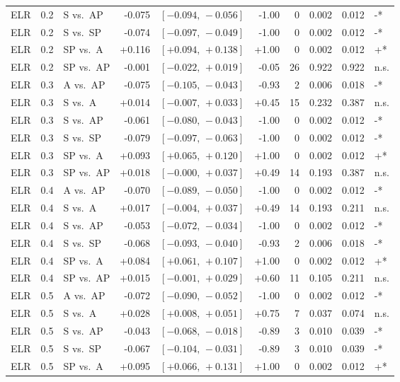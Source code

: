 \begin{landscape}
\begin{scriptsize}
\begin{longtable}{lllrrrrrrl}
ELR & 0.2 & S vs.\ AP & -0.075 & $[-0.094,\,-0.056]$ & -1.00 & 0 & 0.002 & 0.012 & -* \\
ELR & 0.2 & S vs.\ SP & -0.074 & $[-0.097,\,-0.049]$ & -1.00 & 0 & 0.002 & 0.012 & -* \\
ELR & 0.2 & SP vs.\ A & +0.116 & $[+0.094,\,+0.138]$ & +1.00 & 0 & 0.002 & 0.012 & +* \\
ELR & 0.2 & SP vs.\ AP & -0.001 & $[-0.022,\,+0.019]$ & -0.05 & 26 & 0.922 & 0.922 & n.s. \\
ELR & 0.3 & A vs.\ AP & -0.075 & $[-0.105,\,-0.043]$ & -0.93 & 2 & 0.006 & 0.018 & -* \\
ELR & 0.3 & S vs.\ A & +0.014 & $[-0.007,\,+0.033]$ & +0.45 & 15 & 0.232 & 0.387 & n.s. \\
ELR & 0.3 & S vs.\ AP & -0.061 & $[-0.080,\,-0.043]$ & -1.00 & 0 & 0.002 & 0.012 & -* \\
ELR & 0.3 & S vs.\ SP & -0.079 & $[-0.097,\,-0.063]$ & -1.00 & 0 & 0.002 & 0.012 & -* \\
ELR & 0.3 & SP vs.\ A & +0.093 & $[+0.065,\,+0.120]$ & +1.00 & 0 & 0.002 & 0.012 & +* \\
ELR & 0.3 & SP vs.\ AP & +0.018 & $[-0.000,\,+0.037]$ & +0.49 & 14 & 0.193 & 0.387 & n.s. \\
ELR & 0.4 & A vs.\ AP & -0.070 & $[-0.089,\,-0.050]$ & -1.00 & 0 & 0.002 & 0.012 & -* \\
ELR & 0.4 & S vs.\ A & +0.017 & $[-0.004,\,+0.037]$ & +0.49 & 14 & 0.193 & 0.211 & n.s. \\
ELR & 0.4 & S vs.\ AP & -0.053 & $[-0.072,\,-0.034]$ & -1.00 & 0 & 0.002 & 0.012 & -* \\
ELR & 0.4 & S vs.\ SP & -0.068 & $[-0.093,\,-0.040]$ & -0.93 & 2 & 0.006 & 0.018 & -* \\
ELR & 0.4 & SP vs.\ A & +0.084 & $[+0.061,\,+0.107]$ & +1.00 & 0 & 0.002 & 0.012 & +* \\
ELR & 0.4 & SP vs.\ AP & +0.015 & $[-0.001,\,+0.029]$ & +0.60 & 11 & 0.105 & 0.211 & n.s. \\
ELR & 0.5 & A vs.\ AP & -0.072 & $[-0.090,\,-0.052]$ & -1.00 & 0 & 0.002 & 0.012 & -* \\
ELR & 0.5 & S vs.\ A & +0.028 & $[+0.008,\,+0.051]$ & +0.75 & 7 & 0.037 & 0.074 & n.s. \\
ELR & 0.5 & S vs.\ AP & -0.043 & $[-0.068,\,-0.018]$ & -0.89 & 3 & 0.010 & 0.039 & -* \\
ELR & 0.5 & S vs.\ SP & -0.067 & $[-0.104,\,-0.031]$ & -0.89 & 3 & 0.010 & 0.039 & -* \\
ELR & 0.5 & SP vs.\ A & +0.095 & $[+0.066,\,+0.131]$ & +1.00 & 0 & 0.002 & 0.012 & +* \\

\end{longtable}
\end{scriptsize}
\end{landscape}
